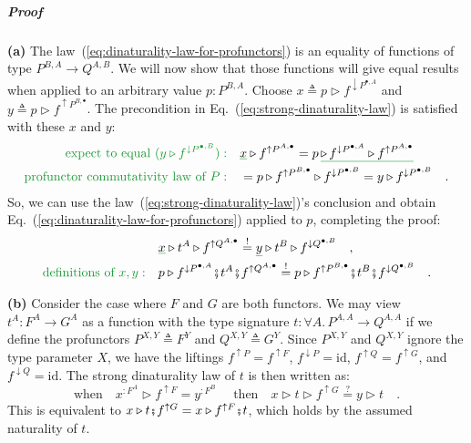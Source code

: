 \subparagraph{Proof}

\textbf{(a)} The law~(\ref{eq:dinaturality-law-for-profunctors})
is an equality of functions of type $P^{B,A}\rightarrow Q^{A,B}$.
We will now show that those functions will give equal results when
applied to an arbitrary value $p:P^{B,A}$. Choose $x\triangleq p\triangleright f^{\downarrow P^{\bullet,A}}$
and $y\triangleq p\triangleright f^{\uparrow P^{B,\bullet}}$. The
precondition in Eq.~(\ref{eq:strong-dinaturality-law}) is satisfied
with these $x$ and $y$:
\begin{align*}
{\color{greenunder}\text{expect to equal }(y\triangleright f^{\downarrow P^{\bullet,B}}):}\quad & \gunderline x\triangleright f^{\uparrow P^{A,\bullet}}=p\,\gunderline{\triangleright\,f^{\downarrow P^{\bullet,A}}\triangleright f^{\uparrow P^{A,\bullet}}}\\
{\color{greenunder}\text{profunctor commutativity law of }P:}\quad & =p\triangleright f^{\uparrow P^{B,\bullet}}\triangleright f^{\downarrow P^{\bullet,B}}=y\triangleright f^{\downarrow P^{\bullet,B}}\quad.
\end{align*}
So, we can use the law~(\ref{eq:strong-dinaturality-law})\textsf{'}s conclusion
and obtain Eq.~(\ref{eq:dinaturality-law-for-profunctors}) applied
to $p$, completing the proof:
\begin{align*}
 & \gunderline x\triangleright t^{A}\triangleright f^{\uparrow Q^{A,\bullet}}\overset{!}{=}\gunderline y\triangleright t^{B}\triangleright f^{\downarrow Q^{\bullet,B}}\quad,\\
{\color{greenunder}\text{definitions of }x,y:}\quad & p\triangleright f^{\downarrow P^{\bullet,A}}\bef t^{A}\bef f^{\uparrow Q^{A,\bullet}}\overset{!}{=}p\triangleright f^{\uparrow P^{B,\bullet}}\bef t^{B}\bef f^{\downarrow Q^{\bullet,B}}\quad.
\end{align*}

\textbf{(b)} Consider the case where $F$ and $G$ are both functors.
We may view $t^{A}:F^{A}\rightarrow G^{A}$ as a function with the
type signature $t:\forall A.\,P^{A,A}\rightarrow Q^{A,A}$ if we define
the profunctors $P^{X,Y}\triangleq F^{Y}$ and $Q^{X,Y}\triangleq G^{Y}$.
Since $P^{X,Y}$ and $Q^{X,Y}$ ignore the type parameter $X$, we
have the liftings $f^{\uparrow P}=f^{\uparrow F}$, $f^{\downarrow P}=\text{id}$,
$f^{\uparrow Q}=f^{\uparrow G}$, and $f^{\downarrow Q}=\text{id}$.
The strong dinaturality law of $t$ is then written as:
\[
\text{when}\quad x^{:F^{A}}\triangleright f^{\uparrow F}=y^{:F^{B}}\quad\text{ then}\quad x\triangleright t\triangleright f^{\uparrow G}\overset{?}{=}y\triangleright t\quad.
\]
This is equivalent to $x\triangleright t\bef f^{\uparrow G}=x\triangleright f^{\uparrow F}\bef t$,
which holds by the assumed naturality of $t$.

